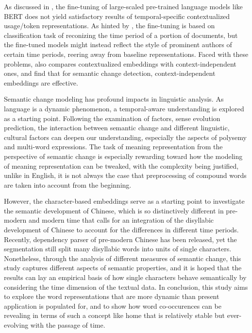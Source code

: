 As discussed in \textcite{giulianelli2019lexical}, the fine-tuning of large-scaled pre-trained language models like BERT does not yield satisfactory results of temporal-specific contextualized usage/token representations. As hinted by \textcite{giulianelli2019lexical}, the fine-tuning is based on classification task of reconizing the time period of a portion of documents, but the fine-tuned models might instead reflect the style of prominent authors of certain time periods, reering away from baseline representations. Faced with these problems, \textcite{kutuzov2020uio} also compares contextualized embeddings with context-independent ones, and find that for semantic change detection, context-independent embeddings are effective.

Semantic change modeling has profound impacts in linguistic analysis. As language is a dynamic phenomenon, a temporal-aware understanding is explored as a starting point. Following the examination of factors, sense evolution prediction, the interaction between semantic change and different linguistic, cultural factors can deepen our understanding, especially the aspects of polysemy and multi-word expressions. The task of meaning representation from the perspective of semantic change is especially rewarding toward how the modeling of meaning representation can be tweaked, with the complexity being justified, unlike in English, it is not always the case that preprocessing of compound words are taken into account from the beginning.

However, the character-based embeddings serve as a starting point to investigate the semantic development of Chinese, which is so distinctively different in pre-modern and modern time that calls for an integration of the disyllabic development of Chinese to account for the differences in different time periods. Recently, dependency parser of pre-modern Chinese has been released, yet the segmentation still split many disyllabic words into units of single characters. Nonetheless, through the analysis of different measures of semantic change, this study captures different aspects of semantic properties, and it is hoped that the results can lay an empirical basis of how single characters behave semantically by considering the time dimension of the textual data. In conclusion, this study aims to explore the word representations that are more dynamic than present application is populated for, and to show how word co-occurences can be revealing in terms of such a concept like home that is relatively stable but ever-evolving with the passage of time.

